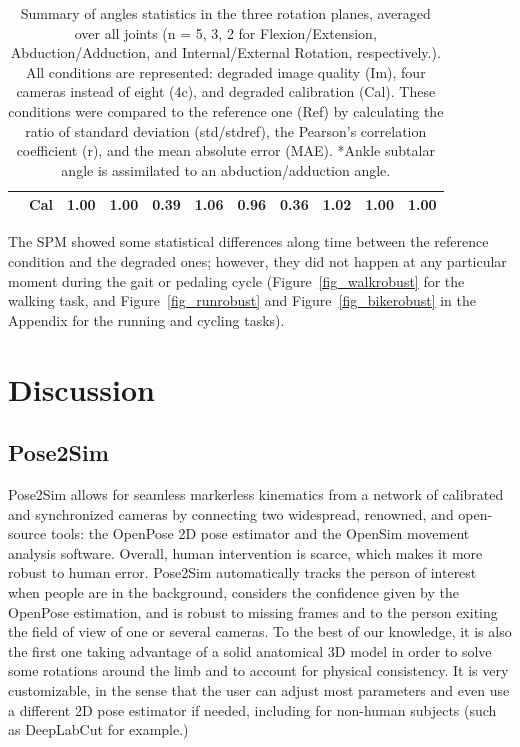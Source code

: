 \begin{table}[!ht]
{\begin{tabular}{lllllllllll}
                    &Cal&	1.00&	1.00&	0.39&	1.06&	0.96&	0.36&	1.02&	1.00&	1.00\\
          \bottomrule
      \end{tabular}}
      \caption{Summary of angles statistics in the three rotation planes, averaged over all joints (n = 5, 3, 2 for Flexion/Extension, Abduction/Adduction, and Internal/External Rotation, respectively.). All conditions are represented: degraded image quality (Im), four cameras instead of eight (4c), and degraded calibration (Cal). These conditions were compared to the reference one (Ref) by calculating the ratio of standard deviation (std/stdref), the Pearson’s correlation coefficient (r), and the mean absolute error (MAE). *Ankle subtalar angle is assimilated to an abduction/adduction angle.}
      \label{table:tab_statsperplane}
\end{table}

The SPM showed some statistical differences along time between the reference condition and the degraded ones; however, they did not happen at any particular moment during the gait or pedaling cycle (Figure~\ref{fig_walkrobust} for the walking task, and Figure~\ref{fig_runrobust} and Figure~\ref{fig_bikerobust} in the Appendix for the running and cycling tasks).\newline

\section{Discussion}

\subsection{Pose2Sim}

Pose2Sim allows for seamless markerless kinematics from a network of calibrated and synchronized cameras by connecting two widespread, renowned, and open-source tools: the OpenPose 2D pose estimator and the OpenSim movement analysis software. Overall, human intervention is scarce, which makes it more robust to human error. Pose2Sim automatically tracks the person of interest when people are in the background, considers the confidence given by the OpenPose estimation, and is robust to missing frames and to the person exiting the field of view of one or several cameras. To the best of our knowledge, it is also the first one taking advantage of a solid anatomical 3D model in order to solve some rotations around the limb and to account for physical consistency. It is very customizable, in the sense that the user can adjust most parameters and even use a different 2D pose estimator if needed, including for non-human subjects (such as DeepLabCut \cite{Mathis2018} for example.)


